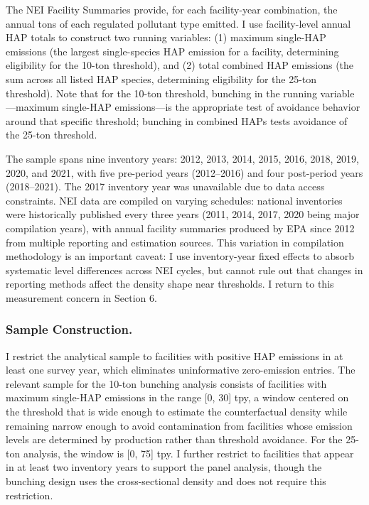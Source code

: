 \documentclass[12pt]{article}
\begin{document}
The NEI Facility Summaries provide, for each facility-year combination, the annual tons of each regulated pollutant type emitted. I use facility-level annual HAP totals to construct two running variables: (1) maximum single-HAP emissions (the largest single-species HAP emission for a facility, determining eligibility for the 10-ton threshold), and (2) total combined HAP emissions (the sum across all listed HAP species, determining eligibility for the 25-ton threshold). Note that for the 10-ton threshold, bunching in the running variable---maximum single-HAP emissions---is the appropriate test of avoidance behavior around that specific threshold; bunching in combined HAPs tests avoidance of the 25-ton threshold.

The sample spans nine inventory years: 2012, 2013, 2014, 2015, 2016, 2018, 2019, 2020, and 2021, with five pre-period years (2012--2016) and four post-period years (2018--2021). The 2017 inventory year was unavailable due to data access constraints. NEI data are compiled on varying schedules: national inventories were historically published every three years (2011, 2014, 2017, 2020 being major compilation years), with annual facility summaries produced by EPA since 2012 from multiple reporting and estimation sources. This variation in compilation methodology is an important caveat: I use inventory-year fixed effects to absorb systematic level differences across NEI cycles, but cannot rule out that changes in reporting methods affect the density shape near thresholds. I return to this measurement concern in Section 6.

\subsubsection*{Sample Construction.}
I restrict the analytical sample to facilities with positive HAP emissions in at least one survey year, which eliminates uninformative zero-emission entries. The relevant sample for the 10-ton bunching analysis consists of facilities with maximum single-HAP emissions in the range [0, 30] tpy, a window centered on the threshold that is wide enough to estimate the counterfactual density while remaining narrow enough to avoid contamination from facilities whose emission levels are determined by production rather than threshold avoidance. For the 25-ton analysis, the window is [0, 75] tpy. I further restrict to facilities that appear in at least two inventory years to support the panel analysis, though the bunching design uses the cross-sectional density and does not require this restriction.
\end{document}
